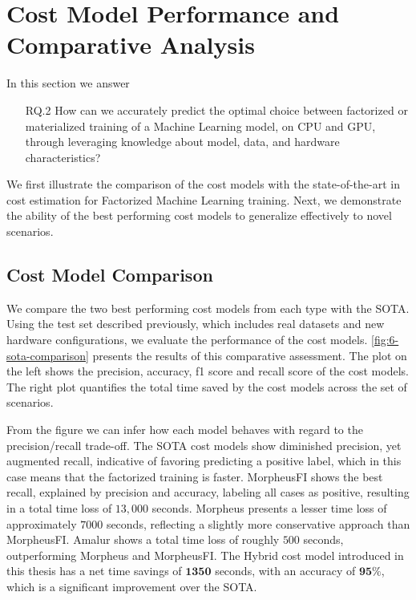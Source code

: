 \section{Cost Model Performance and Comparative Analysis}
\label{sec:eval-model-evaluation}

In this section we answer
\begin{itemize}
  \item[RQ.2] How can we accurately predict the optimal choice between factorized or materialized training of a Machine Learning model, on CPU and GPU, through leveraging knowledge about model, data, and hardware characteristics?
\end{itemize}

We first illustrate the comparison of the cost models with the state-of-the-art in cost estimation for Factorized Machine Learning training. Next, we demonstrate the ability of the best performing cost models to generalize effectively to novel scenarios.

\subsection{Cost Model Comparison}
\label{subsec:6-sota-comparison}
We compare the two best performing cost models from each type with the SOTA. Using the test set described previously, which includes real datasets and new hardware configurations, we evaluate the performance of the cost models. \autoref{fig:6-sota-comparison} presents the results of this comparative assessment. The plot on the left shows the precision, accuracy, f1 score and recall score of the cost models. The right plot quantifies the total time saved by the cost models across the set of scenarios.

From the figure we can infer how each model behaves with regard to the precision/recall trade-off. The SOTA cost models show diminished precision, yet augmented recall, indicative of favoring predicting a positive label, which in this case means that the factorized training is faster. MorpheusFI \cite{MorpheusFI} shows the best recall, explained by precision and accuracy, labeling all cases as positive, resulting in a total time loss of $13,000$ seconds. Morpheus \cite{orion_learning_gen_lin_models} presents a lesser time loss of approximately $7000$ seconds, reflecting a slightly more conservative approach than MorpheusFI. Amalur \cite{amalur} shows a total time loss of roughly $500$ seconds, outperforming Morpheus and MorpheusFI. The Hybrid cost model introduced in this thesis has a net time savings of $\mathbf{1350}$ seconds, with an accuracy of $\mathbf{95\%}$, which is a significant improvement over the SOTA.

